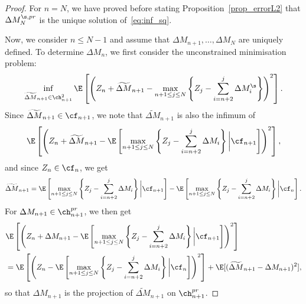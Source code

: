 \begin{proof}
For $n=N$, we have proved before stating Proposition~\ref{prop_errorL2} that $\Delta M^{\s,pr}_{N}$ is the unique solution of~\eqref{eq:inf_sq}. 

Now, we consider $n\le N-1$ and assume that $\Delta M_{n+1},\dots,\Delta M_N$ are uniquely defined. To determine $\Delta M_n$, we first consider the unconstrained minimisation problem:
$$\inf_{\widetilde{\Delta M}_{n+1} \in \ch^2_{n+1}}\E\left[ \left( Z_{n} + \widetilde{\Delta M}_{n+1}  - \max_{n + 1\le j \le N} \left\{Z_{j} - \sum_{i=n+2}^{j} \Delta M^\s_i\right\}\right)^2\right].$$
Since $\widetilde{\Delta M}_{n+1}\in \cf_{n+1}$, we note that $\widetilde{\Delta M}_{n+1}$ is also the infimum of 
$$\E\left[ \left(Z_{n} + \widetilde{\Delta M}_{n+1}  - \E\left[ \max_{n + 1\le j \le N} \left\{Z_{j} - \sum_{i=n+2}^{j} \Delta M_i\right\} \bigg| \cf_{n+1} \right]\right)^2 \right],$$
and since $Z_n \in \cf_n$, we get 
$$\widetilde{\Delta M}_{n+1}= \E\left[ \max_{n + 1\le j \le N} \left\{ Z_{j} - \sum_{i=n+2}^{j} \Delta {M}_i \right\}\bigg|\cf_{n+1} \right]-\E\left[\max_{n + 1\le j \le N} \left\{ Z_{j} - \sum_{i=n+2}^{j} \Delta {M}_i \right\}\bigg|\cf_{n}\right]. $$
For $\Delta M_{n+1} \in \ch_{n+1}^{pr}$, we then get
\begin{align*}
  &\E\left[ \left(Z_{n} + \Delta M_{n+1}  - \E\left[ \max_{n + 1\le j \le N} \left\{Z_{j} - \sum_{i=n+2}^{j} \Delta M_i\right\} \bigg| \cf_{n+1} \right]\right)^2 \right] \\
  &= \E\left[ \left(Z_{n}  - \E\left[ \max_{n + 1\le j \le N} \left\{Z_{j} - \sum_{i=n+2}^{j} \Delta M_i\right\} \bigg| \cf_{n} \right]\right)^2 \right]+\E[(\widetilde{\Delta M}_{n+1}-\Delta M_{n+1})^2],
\end{align*}
so that $\Delta M_{n+1}$ is the projection of $\widetilde{\Delta M}_{n+1}$ on $\ch_{n+1}^{pr}$. 




\end{proof}

